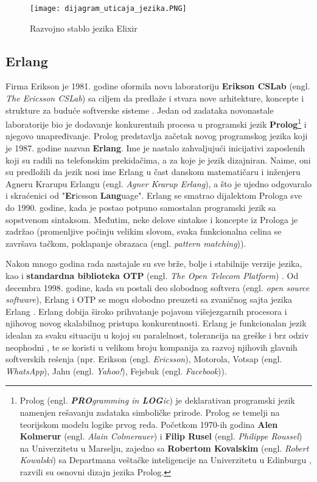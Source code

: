 \documentclass[12pt,oneside]{memoir}
\begin{document}
\begin{figure}[!ht]
  \centering
  \texttt{[image: dijagram\_uticaja\_jezika.PNG]}
  \caption{Razvojno stablo jezika Elixir}
  \label{fig:razvojnoStablo}
\end{figure}



\subsection{Erlang}
Firma Erikson je 1981. godine oformila novu laboratoriju \textbf{Erikson CSLab} (engl. \textit{The Ericsson CSLab}) sa ciljem da predlaže i stvara nove arhitekture, koncepte i strukture za buduće softverske sisteme \cite{ErlangBook2}. Jedan od zadataka novonastale laboratorije bio je dodavanje konkurentnih procesa u programski jezik \textbf{Prolog}\footnote{Prolog (engl. \textit{\textbf{PRO}gramming in \textbf{LOG}ic}) je deklarativan programski jezik namenjen rešavanju zadataka simboličke prirode. Prolog se temelji na teorijskom modelu logike prvog reda. Početkom 1970-ih godina \textbf{Alen Kolmerur} (engl. \textit{Alain Colmerauer}) i \textbf{Filip Rusel} (engl. \textit{Philippe Roussel}) na Univerzitetu u Marselju, zajedno sa \textbf{Robertom Kovalskim} (engl. \textit{Robert Kowalski}) sa Departmana veštačke inteligencije na Univerzitetu u Edinburgu , razvili su osnovni dizajn jezika Prolog.} i njegovo unapređivanje. Prolog predstavlja začetak novog programskog jezika koji je 1987. godine nazvan \textbf{Erlang}. Ime je nastalo zahvaljujući inicijativi zaposlenih koji su radili na telefonskim prekidačima, a za koje je jezik dizajniran. Naime, oni su predložili da jezik nosi ime Erlang u čast danskom matematičaru i inženjeru Agneru Krarupu Erlangu (engl. \textit{Agner Krarup Erlang}), a što je ujedno odgovaralo i skraćenici od  "\textbf{Er}icsson \textbf{Lang}uage". Erlang se smatrao dijalektom Prologa sve do 1990. godine, kada je postao potpuno samostalan programski jezik sa sopstvenom sintaksom. Međutim, neke delove sintakse i koncepte iz Prologa je zadržao (promenljive počinju velikim slovom, svaka funkcionalna celina se završava tačkom, poklapanje obrazaca (engl. \textit{pattern matching})).

Nakon mnogo godina rada nastajale su sve brže, bolje i stabilnije verzije jezika, kao i \textbf{standardna biblioteka OTP} (engl. \textit{The Open Telecom Platform}) \cite{OTP}. Od decembra 1998. godine, kada su postali deo slobodnog softvera (engl. \textit{open source software}), Erlang i OTP se mogu slobodno preuzeti sa zvaničnog sajta jezika Erlang \cite{OTP}. Erlang dobija široko prihvatanje pojavom višejezgarnih procesora i njihovog novog skalabilnog pristupa konkurentnosti. Erlang je funkcionalan jezik idealan za svaku situaciju u kojoj su paralelnost, tolerancija na greške i brz odziv neophodni \cite{ErlangBook}, te se koristi u velikom broju kompanija za razvoj njihovih glavnih softverskih rešenja (npr. Erikson (engl. \textit{Ericsson}), Motorola, Votsap (engl. \textit{WhatsApp}), Jahu (engl. \textit{Yahoo!}),
Fejsbuk (engl. \textit{Facebook})).
\end{document}
